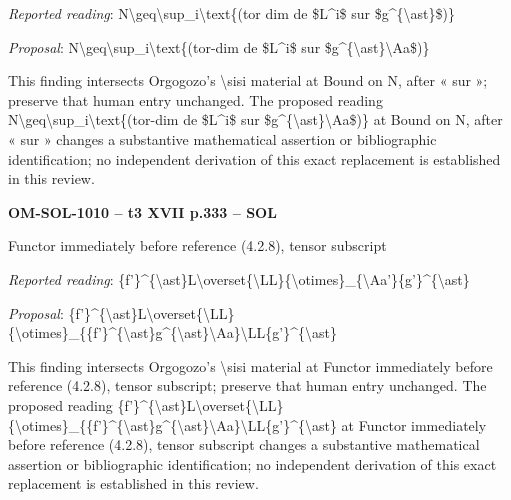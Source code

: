 \emph{Reported reading}: N\textbackslash{}geq\textbackslash{}sup\_i\textbackslash{}text\{(tor dim de \$L\textasciicircum{}i\$ sur \$g\textasciicircum{}\{\textbackslash{}ast\}\$)\}\par
\emph{Proposal}: N\textbackslash{}geq\textbackslash{}sup\_i\textbackslash{}text\{(tor-dim de \$L\textasciicircum{}i\$ sur \$g\textasciicircum{}\{\textbackslash{}ast\}\textbackslash{}Aa\$)\}\par
This finding intersects Orgogozo's \textbackslash{}sisi material at Bound on N, after « sur »; preserve that human entry unchanged. The proposed reading N\textbackslash{}geq\textbackslash{}sup\_i\textbackslash{}text\{(tor-dim de \$L\textasciicircum{}i\$ sur \$g\textasciicircum{}\{\textbackslash{}ast\}\textbackslash{}Aa\$)\} at Bound on N, after « sur » changes a substantive mathematical assertion or bibliographic identification; no independent derivation of this exact replacement is established in this review.\par
\par\noindent\textbf{OM-SOL-1010 -- t3 XVII p.333 -- SOL}\par
Functor immediately before reference (4.2.8), tensor subscript\par
\emph{Reported reading}: \{f'\}\textasciicircum{}\{\textbackslash{}ast\}L\textbackslash{}overset\{\textbackslash{}LL\}\{\textbackslash{}otimes\}\_\{\textbackslash{}Aa'\}\{g'\}\textasciicircum{}\{\textbackslash{}ast\}\par
\emph{Proposal}: \{f'\}\textasciicircum{}\{\textbackslash{}ast\}L\textbackslash{}overset\{\textbackslash{}LL\}\{\textbackslash{}otimes\}\_\{\{f'\}\textasciicircum{}\{\textbackslash{}ast\}g\textasciicircum{}\{\textbackslash{}ast\}\textbackslash{}Aa\}\textbackslash{}LL\{g'\}\textasciicircum{}\{\textbackslash{}ast\}\par
This finding intersects Orgogozo's \textbackslash{}sisi material at Functor immediately before reference (4.2.8), tensor subscript; preserve that human entry unchanged. The proposed reading \{f'\}\textasciicircum{}\{\textbackslash{}ast\}L\textbackslash{}overset\{\textbackslash{}LL\}\{\textbackslash{}otimes\}\_\{\{f'\}\textasciicircum{}\{\textbackslash{}ast\}g\textasciicircum{}\{\textbackslash{}ast\}\textbackslash{}Aa\}\textbackslash{}LL\{g'\}\textasciicircum{}\{\textbackslash{}ast\} at Functor immediately before reference (4.2.8), tensor subscript changes a substantive mathematical assertion or bibliographic identification; no independent derivation of this exact replacement is established in this review.\par
